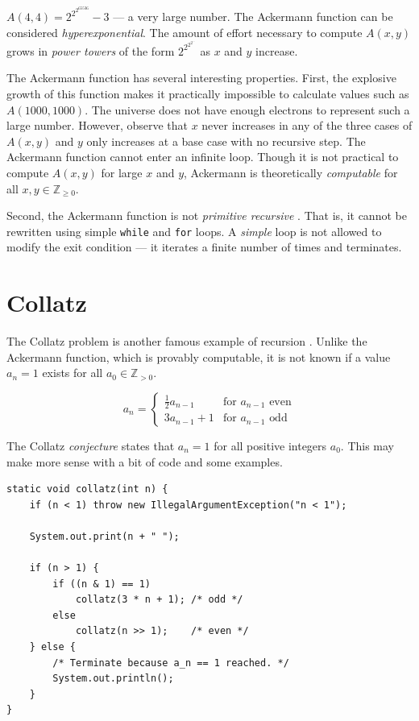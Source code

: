 \documentclass{book}
\begin{document}
$A(4,4)=2^{2^{2^{65536}}}-3$ --- a very large number. The Ackermann function can be considered \textit{hyperexponential}. The amount of effort necessary to compute $A(x,y)$ grows in \textit{power towers} of the form $2^{2^{2^{2^{...}}}}$ as $x$ and $y$ increase.

The Ackermann function has several interesting properties. First, the explosive growth of this function makes it practically impossible to calculate values such as $A(1000,1000)$. The universe does not have enough electrons to represent such a large number. However, observe that $x$ never increases in any of the three cases of $A(x,y)$ and $y$ only increases at a base case with no recursive step. The Ackermann function cannot enter an infinite loop. Though it is not practical to compute $A(x,y)$ for large $x$ and $y$, Ackermann is theoretically \textit{computable} for all $x,y \in \mathbb{Z}_{\ge 0}$.

Second, the Ackermann function is not \textit{primitive recursive} \cite{computerphileackermann}. That is, it cannot be rewritten using simple \texttt{while} and \texttt{for} loops. A \textit{simple} loop is not allowed to modify the exit condition --- it iterates a finite number of times and terminates.

\section{Collatz}

The Collatz problem is another famous example of recursion \cite{weissteinCollatz}. Unlike the Ackermann function, which is provably computable, it is not known if a value $a_n=1$ exists for all $a_0 \in \mathbb{Z}_{> 0}$.

\begin{equation*}
a_n =
\begin{cases}
\frac{1}{2}a_{n-1} & \textrm{for } a_{n-1} \textrm{ even} \\
3 a_{n-1} + 1 & \textrm{for } a_{n-1} \textrm{ odd}
\end{cases}
\end{equation*}

The Collatz \textit{conjecture} states that $a_n = 1$ for all positive integers $a_0$. This may make more sense with a bit of code and some examples.

\begin{lstlisting}
static void collatz(int n) {
	if (n < 1) throw new IllegalArgumentException("n < 1");

	System.out.print(n + " ");
    
	if (n > 1) {
		if ((n & 1) == 1)
			collatz(3 * n + 1); /* odd */
		else
			collatz(n >> 1);    /* even */
	} else {
		/* Terminate because a_n == 1 reached. */
		System.out.println();
	}
}
\end{lstlisting}
\end{document}
